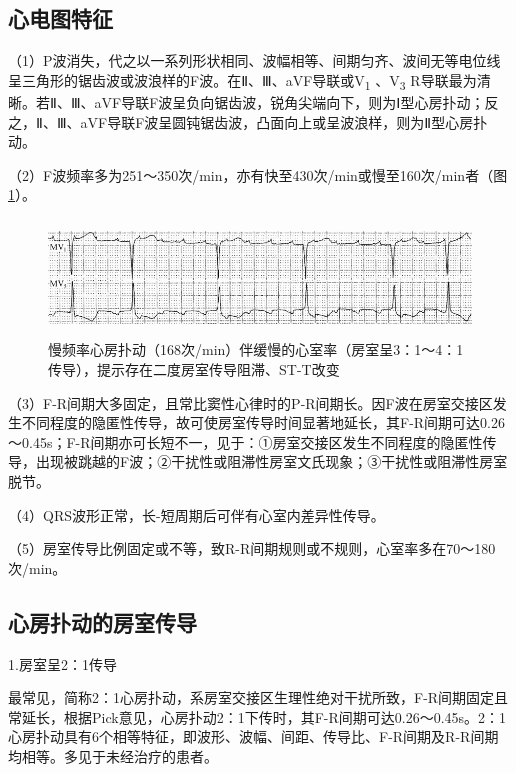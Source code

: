 \protect\hypertarget{text00020.htmlux5cux23subid194}{}{}

\subsection{心电图特征}

（1）P波消失，代之以一系列形状相同、波幅相等、间期匀齐、波间无等电位线呈三角形的锯齿波或波浪样的F波。在Ⅱ、Ⅲ、aVF导联或V\textsubscript{1}
、V\textsubscript{3}
R导联最为清晰。若Ⅱ、Ⅲ、aVF导联F波呈负向锯齿波，锐角尖端向下，则为Ⅰ型心房扑动；反之，Ⅱ、Ⅲ、aVF导联F波呈圆钝锯齿波，凸面向上或呈波浪样，则为Ⅱ型心房扑动。

（2）F波频率多为251～350次/min，亦有快至430次/min或慢至160次/min者（图\ref{fig13-6}）。

\begin{figure}[!htbp]
 \centering
 \includegraphics[width=5.58333in,height=1.21875in]{./images/Image00214.jpg}
 \captionsetup{justification=centering}
 \caption{慢频率心房扑动（168次/min）伴缓慢的心室率（房室呈3：1～4：1传导），提示存在二度房室传导阻滞、ST-T改变}
 \label{fig13-6}
  \end{figure} 

（3）F-R间期大多固定，且常比窦性心律时的P-R间期长。因F波在房室交接区发生不同程度的隐匿性传导，故可使房室传导时间显著地延长，其F-R间期可达0.26～0.45s；F-R间期亦可长短不一，见于：①房室交接区发生不同程度的隐匿性传导，出现被跳越的F波；②干扰性或阻滞性房室文氏现象；③干扰性或阻滞性房室脱节。

（4）QRS波形正常，长-短周期后可伴有心室内差异性传导。

（5）房室传导比例固定或不等，致R-R间期规则或不规则，心室率多在70～180次/min。

\protect\hypertarget{text00020.htmlux5cux23subid195}{}{}

\subsection{心房扑动的房室传导}

1.房室呈2：1传导

最常见，简称2：1心房扑动，系房室交接区生理性绝对干扰所致，F-R间期固定且常延长，根据Pick意见，心房扑动2：1下传时，其F-R间期可达0.26～0.45s。2：1心房扑动具有6个相等特征，即波形、波幅、间距、传导比、F-R间期及R-R间期均相等。多见于未经治疗的患者。

